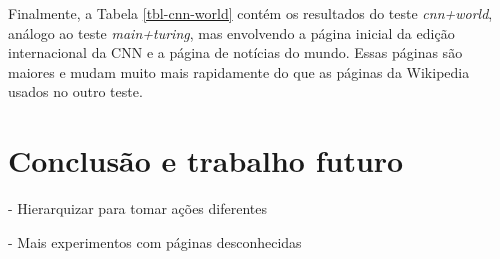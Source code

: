 \documentclass[10pt,twocolumn,letterpaper]{article}
\begin{document}
Finalmente, a Tabela \ref{tbl-cnn-world} contém os resultados do teste \emph{cnn+world}, análogo ao teste \emph{main+turing}, mas envolvendo a página inicial da edição internacional da CNN e a página de notícias do mundo. Essas páginas são maiores e mudam muito mais rapidamente do que as páginas da Wikipedia usados no outro teste.

\section{Conclusão e trabalho futuro}

- Hierarquizar para tomar ações diferentes

- Mais experimentos com páginas desconhecidas

{\small


}
\end{document}
